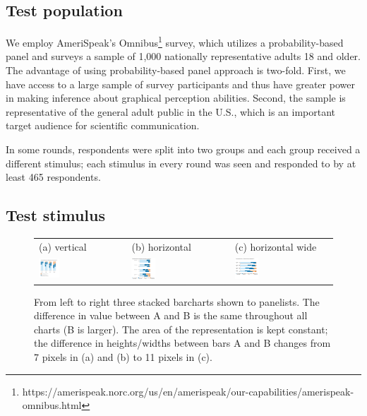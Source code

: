 \documentclass[10pt]{article}\usepackage[]{graphicx}\usepackage[table]{xcolor}
\begin{document}
\subsection{Test population}

We employ AmeriSpeak's Omnibus\footnote{https://amerispeak.norc.org/us/en/amerispeak/our-capabilities/amerispeak-omnibus.html} survey, which utilizes a probability-based panel and surveys a sample of 1,000 nationally representative adults 18 and older. The advantage of using probability-based panel approach is two-fold. First, we have access to a large sample of survey participants and thus have greater power in making inference about graphical perception abilities. Second, the sample is representative of the general adult public in the U.S., which is an important target audience for scientific communication. 

In some rounds, respondents were split into two groups and each group received a different stimulus; each stimulus in every round was seen and responded to by at least 465 respondents. %


\subsection{Test stimulus}

\begin{figure}
\centering
\begin{tabular}{lll}
(a) vertical & (b) horizontal & (c) horizontal wide \\
\includegraphics[width=0.25\textwidth]{images/vertical.PNG} &
\includegraphics[width=0.25\textwidth]{images/horizontal.PNG} &
\includegraphics[width=0.25\textwidth]{images/horizontal-wide.PNG} 
\end{tabular}
\caption{\label{stimulus} From left to right three stacked barcharts shown to panelists. The difference in value between A and B is the same throughout all charts (B is larger). The area of the representation is kept constant; the difference in heights/widths between bars A and B changes from 7 pixels in (a) and (b) to 11 pixels in (c). }
\end{figure}
\end{document}

